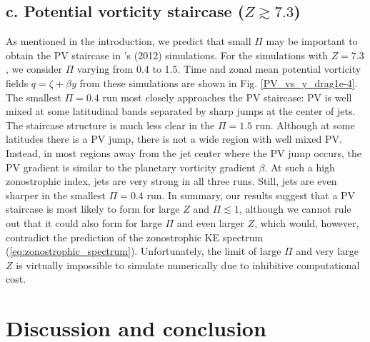 \documentclass{jfm}
\begin{document}
\subsection*{c. Potential vorticity staircase ($Z\apprge7.3$)}

As mentioned in the introduction, we predict that small $\Pi$ may be
important to obtain the PV staircase in \citeauthor{Scott2012}'s (2012) simulations.
For the simulations with $Z=7.3$, we consider $\Pi$ varying from 0.4 to 1.5.
Time and zonal mean potential vorticity fields $q=\zeta+\beta y$
from these simulations are shown in Fig. \ref{PV_vs_y_drag1e-4}.
The smallest $\Pi=0.4$ run most closely approaches the PV staircase: 
PV is well mixed at some latitudinal bands 
separated by sharp jumps at the center of jets. 
The staircase structure is much less clear in the $\Pi=1.5$ run.
Although at some latitudes there is a PV jump, there is not a wide
region with well mixed PV. Instead, in most regions away from
the jet center where the PV jump occurs, the PV gradient is similar to the
planetary vorticity gradient $\beta$. At such a high zonostrophic index, 
jets are very strong in all three runs. Still, jets are even sharper 
in the smallest $\Pi=0.4$ run. In summary, our results suggest that a PV staircase 
is most likely to form for large $Z$ and $\Pi\apprle1$,
although we cannot rule out that it could also form for large $\Pi$ and
even larger $Z$, which would, however, contradict the prediction of the 
zonostrophic KE spectrum (\ref{eq:zonostrophic_spectrum}). Unfortunately,
the limit of large $\Pi$ and very large $Z$  is virtually impossible to 
simulate numerically due to inhibitive computational cost.


\section{Discussion and conclusion}
\end{document}
